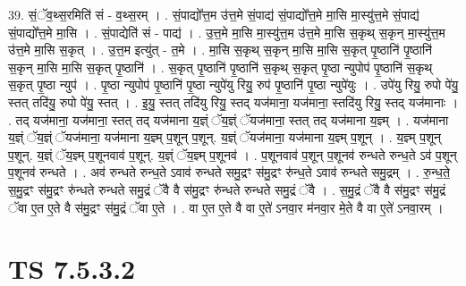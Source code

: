 \documentclass[17pt]{extarticle}
\begin{document}
39. सं॒ॅव॒थ्स॒रमिति॑ सं - व॒थ्स॒रम् । . सं॒पाद्यो᳚त्त॒म उ॑त्त॒मे सं॒पाद्य॑ सं॒पाद्यो᳚त्त॒मे मा॒सि मा॒स्यु॑त्त॒मे सं॒पाद्य॑ सं॒पाद्यो᳚त्त॒मे मा॒सि । . सं॒पाद्येति॑ सं - पाद्य॑ । . उ॒त्त॒मे मा॒सि मा॒स्यु॑त्त॒म उ॑त्त॒मे मा॒सि स॒कृथ् स॒कृन् मा॒स्यु॑त्त॒म उ॑त्त॒मे मा॒सि स॒कृत् । . उ॒त्त॒म इत्यु॑त् - त॒मे । . मा॒सि स॒कृथ् स॒कृन् मा॒सि मा॒सि स॒कृत् पृ॒ष्ठानि॑ पृ॒ष्ठानि॑ स॒कृन् मा॒सि मा॒सि स॒कृत् पृ॒ष्ठानि॑ । . स॒कृत् पृ॒ष्ठानि॑ पृ॒ष्ठानि॑ स॒कृथ् स॒कृत् पृ॒ष्ठा न्युपोप॑ पृ॒ष्ठानि॑ स॒कृथ् स॒कृत् पृ॒ष्ठा न्युप॑ । . पृ॒ष्ठा न्युपोप॑ पृ॒ष्ठानि॑ पृ॒ष्ठा न्युपे॑यु रियु॒ रुप॑ पृ॒ष्ठानि॑ पृ॒ष्ठा न्युपे॑युः । . उपे॑यु रियु॒ रुपो पे॑यु॒ स्तत् तदि॑यु॒ रुपो पे॑यु॒ स्तत् । . इ॒यु॒ स्तत् तदि॑यु रियु॒ स्तद् यज॑माना॒ यज॑माना॒ स्तदि॑यु रियु॒ स्तद् यज॑मानाः । . तद् यज॑माना॒ यज॑माना॒ स्तत् तद् यज॑माना य॒ज्ञ्ं ॅय॒ज्ञ्ं ॅयज॑माना॒ स्तत् तद् यज॑माना य॒ज्ञ्म् । . यज॑माना य॒ज्ञ्ं ॅय॒ज्ञ्ं ॅयज॑माना॒ यज॑माना य॒ज्ञ्म् प॒शून् प॒शून्. य॒ज्ञ्ं ॅयज॑माना॒ यज॑माना य॒ज्ञ्म् प॒शून् । . य॒ज्ञ्म् प॒शून् प॒शून्. य॒ज्ञ्ं ॅय॒ज्ञ्म् प॒शूनवाव॑ प॒शून्. य॒ज्ञ्ं ॅय॒ज्ञ्म् प॒शूनव॑ । . प॒शूनवाव॑ प॒शून् प॒शूनव॑ रुन्धते रुन्ध॒ते ऽव॑ प॒शून् प॒शूनव॑ रुन्धते । . अव॑ रुन्धते रुन्ध॒ते ऽवाव॑ रुन्धते समु॒द्रꣳ स॑मु॒द्रꣳ रु॑न्ध॒ते ऽवाव॑ रुन्धते समु॒द्रम् । . रु॒न्ध॒ते॒ स॒मु॒द्रꣳ स॑मु॒द्रꣳ रु॑न्धते रुन्धते समु॒द्रं ॅवै वै स॑मु॒द्रꣳ रु॑न्धते रुन्धते समु॒द्रं ॅवै । . स॒मु॒द्रं ॅवै वै स॑मु॒द्रꣳ स॑मु॒द्रं ॅवा ए॒त ए॒ते वै स॑मु॒द्रꣳ स॑मु॒द्रं ॅवा ए॒ते । . वा ए॒त ए॒ते वै वा ए॒ते॑ ऽनवा॒र म॑नवा॒र मे॒ते वै वा ए॒ते॑ ऽनवा॒रम् । \newline
\pagebreak
{}

\section{ TS 7.5.3.2 }
\end{document}
